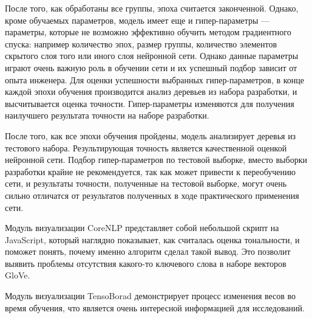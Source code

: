 После того, как обработаны все группы, эпоха считается законченной. Однако, кроме обучаемых параметров, модель имеет еще и гипер-параметры --- параметры, которые не возможно эффективно обучить методом градиентного спуска: например количество эпох, размер группы, количество элементов скрытого слоя того или иного слоя нейронной сети. Однако данные параметры играют очень важную роль в обучении сети и их успешный подбор зависит от опыта инженера. Для оценки успешности выбранных гипер-параметров, в конце каждой эпохи обучения производится анализ деревьев из набора разработки, и высчитывается оценка точности. Гипер-параметры изменяются для получения наилучшего результата точности на наборе разработки.

После того, как все эпохи обучения пройдены, модель анализирует деревья из тестового набора. Результирующая точность является качественной оценкой нейронной сети. Подбор гипер-параметров по тестовой выборке, вместо выборки разработки крайне не рекомендуется, так как может привести к переобучению сети, и результаты точности, полученные на тестовой выборке, могут очень сильно отличатся от результатов полученных в ходе практического применения сети.

Модуль визуализации CoreNLP представляет собой небольшой скрипт на JavaScript, который наглядно показывает, как считалась оценка тональности, и поможет понять, почему именно алгоритм сделал такой вывод. Это позволит выявить проблемы отсутствия какого-то ключевого слова в наборе векторов GloVe.

Модуль визуализации TensoBorad демонстрирует процесс изменения весов во время обучения, что является очень интересной информацией для исследований.